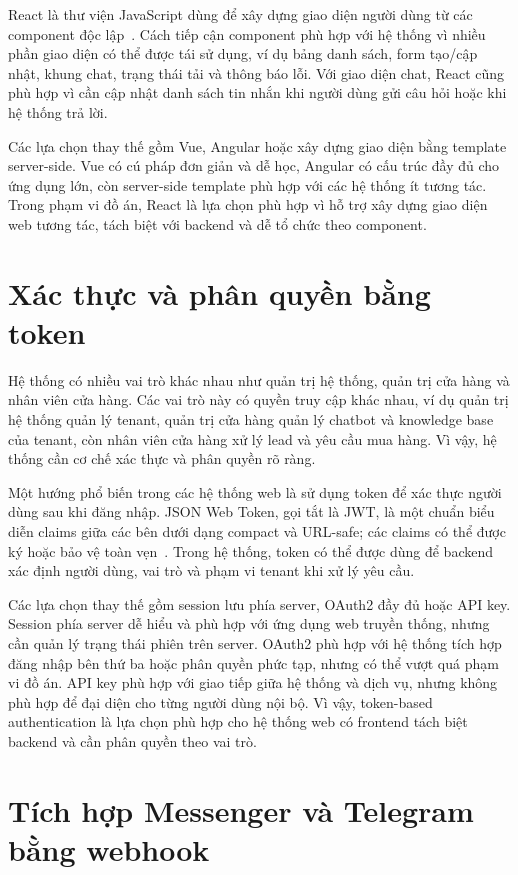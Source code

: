 \documentclass[../DoAn.tex]{subfiles}
\begin{document}
React là thư viện JavaScript dùng để xây dựng giao diện người dùng từ các component độc lập~\cite{react_docs}. Cách tiếp cận component phù hợp với hệ thống vì nhiều phần giao diện có thể được tái sử dụng, ví dụ bảng danh sách, form tạo/cập nhật, khung chat, trạng thái tải và thông báo lỗi. Với giao diện chat, React cũng phù hợp vì cần cập nhật danh sách tin nhắn khi người dùng gửi câu hỏi hoặc khi hệ thống trả lời.

Các lựa chọn thay thế gồm Vue, Angular hoặc xây dựng giao diện bằng template server-side. Vue có cú pháp đơn giản và dễ học, Angular có cấu trúc đầy đủ cho ứng dụng lớn, còn server-side template phù hợp với các hệ thống ít tương tác. Trong phạm vi đồ án, React là lựa chọn phù hợp vì hỗ trợ xây dựng giao diện web tương tác, tách biệt với backend và dễ tổ chức theo component.

\section{Xác thực và phân quyền bằng token}
\label{section:3.10}

Hệ thống có nhiều vai trò khác nhau như quản trị hệ thống, quản trị cửa hàng và nhân viên cửa hàng. Các vai trò này có quyền truy cập khác nhau, ví dụ quản trị hệ thống quản lý tenant, quản trị cửa hàng quản lý chatbot và knowledge base của tenant, còn nhân viên cửa hàng xử lý lead và yêu cầu mua hàng. Vì vậy, hệ thống cần cơ chế xác thực và phân quyền rõ ràng.

Một hướng phổ biến trong các hệ thống web là sử dụng token để xác thực người dùng sau khi đăng nhập. JSON Web Token, gọi tắt là JWT, là một chuẩn biểu diễn claims giữa các bên dưới dạng compact và URL-safe; các claims có thể được ký hoặc bảo vệ toàn vẹn~\cite{jwt_rfc}. Trong hệ thống, token có thể được dùng để backend xác định người dùng, vai trò và phạm vi tenant khi xử lý yêu cầu.

Các lựa chọn thay thế gồm session lưu phía server, OAuth2 đầy đủ hoặc API key. Session phía server dễ hiểu và phù hợp với ứng dụng web truyền thống, nhưng cần quản lý trạng thái phiên trên server. OAuth2 phù hợp với hệ thống tích hợp đăng nhập bên thứ ba hoặc phân quyền phức tạp, nhưng có thể vượt quá phạm vi đồ án. API key phù hợp với giao tiếp giữa hệ thống và dịch vụ, nhưng không phù hợp để đại diện cho từng người dùng nội bộ. Vì vậy, token-based authentication là lựa chọn phù hợp cho hệ thống web có frontend tách biệt backend và cần phân quyền theo vai trò.

\section{Tích hợp Messenger và Telegram bằng webhook}
\label{section:3.11}
\end{document}
